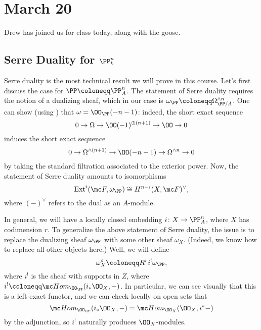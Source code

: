 \documentclass[../notes.tex]{subfiles}
\begin{document}
\section{March 20}

Drew has joined us for class today, along with the goose.

\subsection{Serre Duality for \texorpdfstring{$\PP^n_k$}{ Pn}}
Serre duality is the most technical result we will prove in this course. Let's first discuss the case for $\PP\coloneqq\PP^n_A$. The statement of Serre duality requires the notion of a dualizing sheaf, which in our case is $\omega_\PP\coloneqq\Omega_{\PP/A}^{\land n}$. One can show (using ) that $\omega=\OO_\PP(-n-1)$: indeed, the short exact sequence
\[0\to\Omega\to\OO(-1)^{\oplus(n+1)}\to\OO\to0\]
induces the short exact sequence
\[0\to\Omega^{\land(n+1)}\to\OO(-n-1)\to\Omega^{\land n}\to0\]
by taking the standard filtration associated to the exterior power. Now, the statement of Serre duality amounts to isomorphisms
\[\mathrm{Ext}^i(\mc F,\omega_\PP)\cong H^{n-i}(X,\mc F)^\lor,\]
where $(-)^\lor$ refers to the dual as an $A$-module.

In general, we will have a locally closed embedding $i\colon X\to\PP^n_A$, where $X$ has codimension $r$. To generalize the above statement of Serre duality, the issue is to replace the dualizing sheaf $\omega_\PP$ with some other sheaf $\omega_X$. (Indeed, we know how to replace all other objects here.) Well, we will define
\[\omega_X^\circ\coloneqq R^ri^!\omega_\PP,\]
where $i^!$ is the sheaf with supports in $Z$, where $i^!\coloneqq\mc Hom_{\OO_\PP}(i_*\OO_X,-)$. In particular, we can see visually that this is a left-exact functor, and we can check locally on open sets that
\[\mc Hom_{\OO_\PP}(i_*\OO_X,-)=\mc Hom_{\OO_X}(\OO_X,i^*-)\]
by the adjunction, so $i^!$ naturally produces $\OO_X$-modules.
\end{document}
